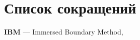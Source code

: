 \newpage

\section*{Список сокращений}

\textbf{IBM} --- Immersed Boundary Method, \pageref{abbr:ibm}
